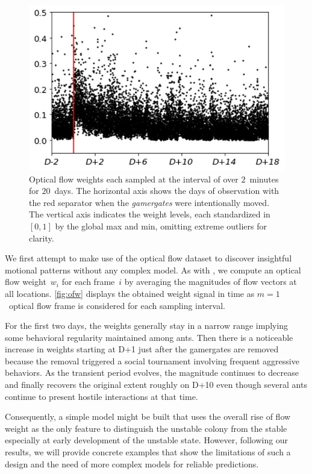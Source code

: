 \documentclass[letterpaper]{article} %
\let\orgautoref\autoref
\providecommand{\Autoref}
{\def\equationautorefname{Equation}%
	\def\figureautorefname{Figure}%
	\def\subfigureautorefname{Figure}%
	\def\Itemautorefname{Item}%
	\def\tableautorefname{Table}%
	\def\exerciseautorefname{Exercise}%
	\def\starexerciseautorefname{Exercise}%
	\def\sectionautorefname{Section}%
	\def\subsectionautorefname{Section}%
	\def\subsubsectionautorefname{Section}%
	\def\chapterautorefname{Section}%
	\def\partautorefname{Part}%
	\orgautoref}
\renewcommand{\autoref}
{\def\equationautorefname{Equation}%
	\def\figureautorefname{Fig.}%
	\def\subfigureautorefname{Fig.}%
	\def\Itemautorefname{item}%
	\def\tableautorefname{Table}%
	\def\exerciseautorefname{Exercise}%
	\def\starexerciseautorefname{Exercise}%
	\def\sectionautorefname{Section}%
	\def\subsectionautorefname{Section}%
	\def\subsubsectionautorefname{Section}%
	\def\chapterautorefname{Section}%
	\def\partautorefname{Part}%
	\orgautoref}
\begin{document}
\begin{figure}[t]
	\centering
	\includegraphics[width=.7\columnwidth]{ofw}
	\caption{
		Optical flow weights each sampled at the interval of
		over $2$~minutes for $20$~days.
		The horizontal axis shows the days of observation
		with the red separator
		when the \emph{gamergates} were intentionally moved.
		The vertical axis indicates the weight levels, each
		standardized in $[0, 1]$ by the global max and
		min, omitting extreme outliers for clarity.
	}
	\label{fig:ofw}
\end{figure}
%
We first attempt to make use of the optical flow dataset to discover
insightful motional patterns without any complex model. As with
\citet{MCFT13}, we compute an optical flow weight~$w_i$ for each
frame~$i$ by averaging the magnitudes of flow vectors at all locations.
\Autoref{fig:ofw} displays the obtained weight signal in time as
$m=1$~optical flow frame is considered for each sampling interval.

For the first two days, the weights generally stay in a narrow range
implying some behavioral regularity maintained among ants. Then there is
a noticeable increase in weights starting at D+1 just after the gamergates
are removed because the removal triggered a social
tournament involving frequent aggressive behaviors. As the
transient period evolves, the magnitude continues to decrease and
finally recovers the original extent roughly on D+10 even though
several ants continue to present hostile interactions at that time.

Consequently, a simple model might be built that uses the overall rise
of flow weight as the only feature to distinguish the unstable colony
from the stable especially at early development of the unstable state.
However, following our results, we will provide concrete examples that
show the limitations of such a design and the need of more complex
models for reliable predictions.
\end{document}
